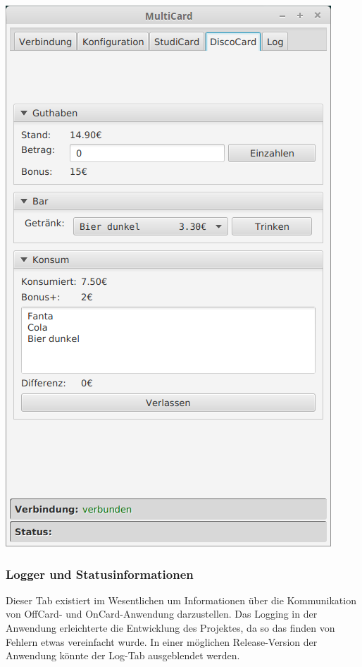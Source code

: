 \begin{center}
	\includegraphics[scale=0.4]{Images/DiscoCardTabEntered}
\end{center}
 
\subsubsection{Logger und Statusinformationen}
Dieser Tab existiert im Wesentlichen um Informationen über die Kommunikation von OffCard- und OnCard-Anwendung darzustellen.
Das Logging in der Anwendung erleichterte die Entwicklung des Projektes, da so das finden von Fehlern etwas vereinfacht wurde.
In einer möglichen Release-Version der Anwendung könnte der Log-Tab ausgeblendet werden.

